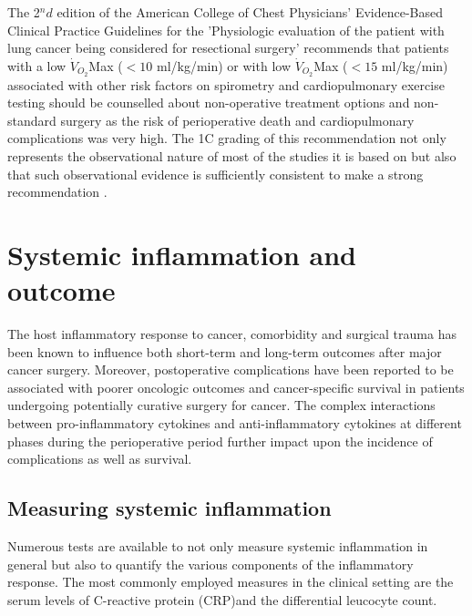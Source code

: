 The 2$^nd$ edition of the American College of Chest Physicians' Evidence-Based Clinical Practice Guidelines for the 'Physiologic evaluation of the patient with lung cancer being considered for resectional surgery' recommends that patients with a low $\dot{V}_{O_2}$Max ($<10$ ml/kg/min) or with low $\dot{V}_{O_2}$Max ($<15$ ml/kg/min) associated with other risk factors on spirometry and cardiopulmonary exercise testing should be counselled about non-operative treatment options and non-standard surgery as the risk of perioperative death and cardiopulmonary complications was very high. 
The 1C grading of this recommendation not only represents the observational nature of most of the studies it is based on but also that such observational evidence is sufficiently consistent \parencite{benzo_complications_2007} to make a strong recommendation \parencite{colice_physiologic_2007}. 

\clearpage

\section{Systemic inflammation and outcome}
\label{sec:intro_systemic_inflammation_outcome}


The host inflammatory response to cancer, comorbidity and surgical trauma has been known to influence both short-term and long-term outcomes after major cancer surgery. 
Moreover, postoperative complications have been reported to be associated with poorer oncologic outcomes and cancer-specific survival in patients undergoing potentially curative surgery for cancer. 
The complex interactions between pro-inflammatory cytokines and anti-inflammatory cytokines at different phases during the perioperative period further impact upon the incidence of complications as well as survival.

\subsection{Measuring systemic inflammation}
Numerous tests are available to not only measure systemic inflammation in general but also to quantify the various components of the inflammatory response. 
The most commonly employed measures in the clinical setting are the serum levels of C-reactive protein (CRP)and the differential leucocyte count. 

